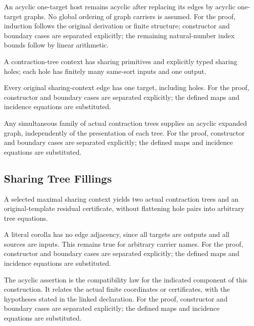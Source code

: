 An acyclic one-target host remains acyclic after replacing its edges by acyclic one-target graphs. No global ordering of graph carriers is assumed.
For the proof, induction follows the original derivation or finite structure; constructor and boundary cases are separated explicitly; the remaining natural-number index bounds follow by linear arithmetic.
\par{}

A contraction-tree context has sharing primitives and explicitly typed sharing holes; each hole has finitely many same-sort inputs and one output.
\par{}

Every original sharing-context edge has one target, including holes.
For the proof, constructor and boundary cases are separated explicitly; the defined maps and incidence equations are substituted.
\par{}

Any simultaneous family of actual contraction trees supplies an acyclic expanded graph, independently of the presentation of each tree.
For the proof, constructor and boundary cases are separated explicitly; the defined maps and incidence equations are substituted.
\par{}

\subsection{Sharing Tree Fillings}
A selected maximal sharing context yields two actual contraction trees and an original-template residual certificate, without flattening hole pairs into arbitrary tree equations.

A literal corolla has no edge adjacency, since all targets are outputs and all sources are inputs. This remains true for arbitrary carrier names.
For the proof, constructor and boundary cases are separated explicitly; the defined maps and incidence equations are substituted.
\par{}

The acyclic assertion is the compatibility law for the indicated component of this construction. It relates the actual finite coordinates or certificates, with the hypotheses stated in the linked declaration.
For the proof, constructor and boundary cases are separated explicitly; the defined maps and incidence equations are substituted.
\par{}

